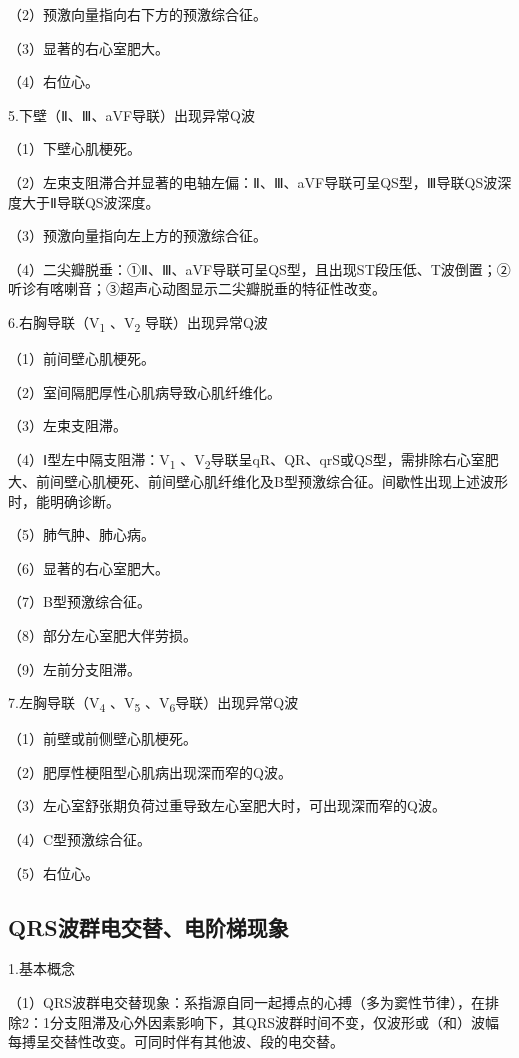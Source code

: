（2）预激向量指向右下方的预激综合征。

（3）显著的右心室肥大。

（4）右位心。

5.下壁（Ⅱ、Ⅲ、aVF导联）出现异常Q波

（1）下壁心肌梗死。

（2）左束支阻滞合并显著的电轴左偏：Ⅱ、Ⅲ、aVF导联可呈QS型，Ⅲ导联QS波深度大于Ⅱ导联QS波深度。

（3）预激向量指向左上方的预激综合征。

（4）二尖瓣脱垂：①Ⅱ、Ⅲ、aVF导联可呈QS型，且出现ST段压低、T波倒置；②听诊有喀喇音；③超声心动图显示二尖瓣脱垂的特征性改变。

6.右胸导联（V\textsubscript{1} 、V\textsubscript{2} 导联）出现异常Q波

（1）前间壁心肌梗死。

（2）室间隔肥厚性心肌病导致心肌纤维化。

（3）左束支阻滞。

（4）Ⅰ型左中隔支阻滞：V\textsubscript{1} 、V\textsubscript{2}导联呈qR、QR、qrS或QS型，需排除右心室肥大、前间壁心肌梗死、前间壁心肌纤维化及B型预激综合征。间歇性出现上述波形时，能明确诊断。

（5）肺气肿、肺心病。

（6）显著的右心室肥大。

（7）B型预激综合征。

（8）部分左心室肥大伴劳损。

（9）左前分支阻滞。

7.左胸导联（V\textsubscript{4} 、V\textsubscript{5} 、V\textsubscript{6}导联）出现异常Q波

（1）前壁或前侧壁心肌梗死。

（2）肥厚性梗阻型心肌病出现深而窄的Q波。

（3）左心室舒张期负荷过重导致左心室肥大时，可出现深而窄的Q波。

（4）C型预激综合征。

（5）右位心。

\protect\hypertarget{text00009.htmlux5cux23subid46}{}{}

\subsection{QRS波群电交替、电阶梯现象}

1.基本概念

（1）QRS波群电交替现象：系指源自同一起搏点的心搏（多为窦性节律），在排除2：1分支阻滞及心外因素影响下，其QRS波群时间不变，仅波形或（和）波幅每搏呈交替性改变。可同时伴有其他波、段的电交替。

